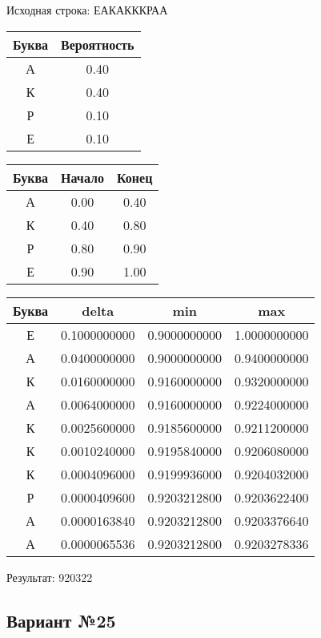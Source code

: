 \documentclass[a4paper, 12pt]{article}
\begin{document}
Исходная строка: ЕАКАКККРАА\
\begin{center}
 \begin{tabular}{ |c|c| } 
  \hline
     Буква & Вероятность \\ \hline
А & 0.40\\\hline
К & 0.40\\\hline
Р & 0.10\\\hline
Е & 0.10
\\ \hline \end{tabular}
\end{center}
\begin{center}
 \begin{tabular}{ |c|c|c| } 
  \hline
     Буква & Начало & Конец \\ \hline
А & 0.00 & 0.40\\\hline
К & 0.40 & 0.80\\\hline
Р & 0.80 & 0.90\\\hline
Е & 0.90 & 1.00
\\ \hline \end{tabular}
\end{center}
\begin{center}
 \begin{tabular}{ |c|c|c|c| } 
  \hline
     Буква & delta & min & max \\ \hline
Е & 0.1000000000 & 0.9000000000 & 1.0000000000\\\hline
А & 0.0400000000 & 0.9000000000 & 0.9400000000\\\hline
К & 0.0160000000 & 0.9160000000 & 0.9320000000\\\hline
А & 0.0064000000 & 0.9160000000 & 0.9224000000\\\hline
К & 0.0025600000 & 0.9185600000 & 0.9211200000\\\hline
К & 0.0010240000 & 0.9195840000 & 0.9206080000\\\hline
К & 0.0004096000 & 0.9199936000 & 0.9204032000\\\hline
Р & 0.0000409600 & 0.9203212800 & 0.9203622400\\\hline
А & 0.0000163840 & 0.9203212800 & 0.9203376640\\\hline
А & 0.0000065536 & 0.9203212800 & 0.9203278336
\\ \hline \end{tabular}
\end{center}
Результат: 920322
\pagebreak
\subsection{Вариант №25}
\end{document}
